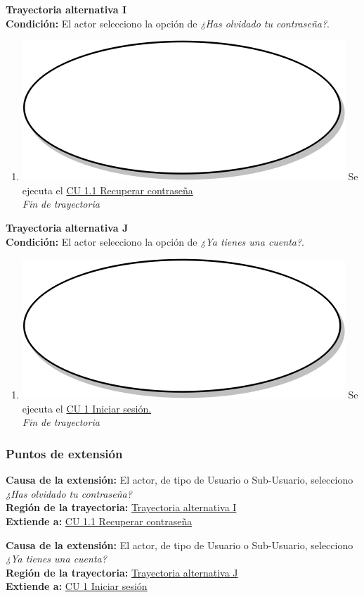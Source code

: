\textbf{Trayectoria alternativa I} \label{cu2_ta_i}\\
\textbf{Condición:} El actor selecciono la opción de \textit{¿Has olvidado tu contraseña?}.\\
 \begin{enumerate}[label=I\arabic*]
    \item {\includegraphics[scale=.05]{Capitulo3/img/proceso.png} Se ejecuta el \hyperref[cu1_1]{CU 1.1 Recuperar contraseña}} \\
    \textit{Fin de trayectoria} \\
\end{enumerate}

\textbf{Trayectoria alternativa J} \label{cu2_ta_j}\\
\textbf{Condición:} El actor selecciono la opción de \textit{¿Ya tienes una cuenta?}.\\
 \begin{enumerate}[label=J\arabic*]
    \item {\includegraphics[scale=.05]{Capitulo3/img/proceso.png} Se ejecuta el \hyperref[cu1]{CU 1 Iniciar sesión.}}\\
    \textit{Fin de trayectoria} \\
\end{enumerate}

\subsubsection{Puntos de extensión}
\noindent \textbf{Causa de la extensión:} El actor, de tipo de Usuario o Sub-Usuario, selecciono \textit{¿Has olvidado tu contraseña?} \\
\textbf{Región de la trayectoria:} \hyperref[cu2_ta_i]{Trayectoria alternativa I} \\
\textbf{Extiende a:} \hyperref[cu1_1]{CU 1.1 Recuperar contraseña} \\ \par

\noindent \textbf{Causa de la extensión:} El actor, de tipo de Usuario o Sub-Usuario, selecciono \textit{¿Ya tienes una cuenta?} \\
\textbf{Región de la trayectoria:} \hyperref[cu2_ta_j]{Trayectoria alternativa J} \\
\textbf{Extiende a:} \hyperref[cu1]{CU 1 Iniciar sesión}
